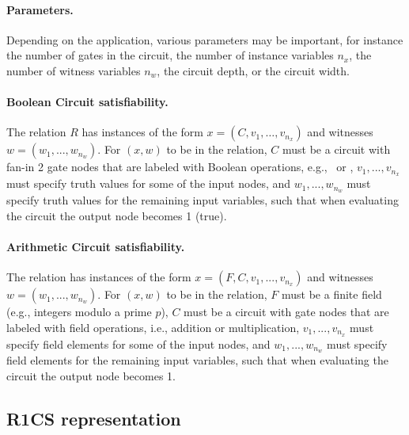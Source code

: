 \paragraph{Parameters.} 
Depending on the application, various parameters may be important, for instance the number of gates in the circuit, the number of instance variables $n_x$, the number of witness variables $n_w$, the circuit depth, or the circuit width.
 
\paragraph{Boolean Circuit satisfiability.} 
	The relation $R$ has instances of the form $x = (C, v_1, \ldots, v_{n_x})$ and witnesses $w = (w_1,...,w_{n_w})$. 
	For $(x,w)$ to be in the relation, $C$ must be a circuit with fan-in 2 gate nodes 
that are labeled with Boolean operations, e.g., \XOR\ or \AND, $v_1,...,v_{n_x}$ must specify 
truth values for some of the input nodes, and $w_1,...,w_{n_w}$ must specify 
truth values for the remaining input variables, such that when evaluating the circuit the output node becomes 1 (true).
 
\paragraph{Arithmetic Circuit satisfiability.} 
	The relation has instances of the form $x = (F, C, v_1,...,v_{n_x})$ and witnesses $w = (w_1,...,w_{n_w})$.
	For $(x,w)$ to be in the relation, $F$ must be a finite field (e.g., integers modulo a prime $p$), $C$ must be a circuit with gate nodes that are labeled with field operations, i.e., addition or multiplication, $v_1,...,v_{n_x}$ must specify field elements for some of the input nodes, and $w_1,...,w_{n_w}$ must specify field elements for the remaining input variables, such that when evaluating the circuit the output node becomes 1.
 


\subsection{R1CS representation}
\label{security:spec-statements-ZK:R1CS-representation}

\newcommand{\brkt}[1]{\ensuremath{\left\langle #1\right\rangle}}

